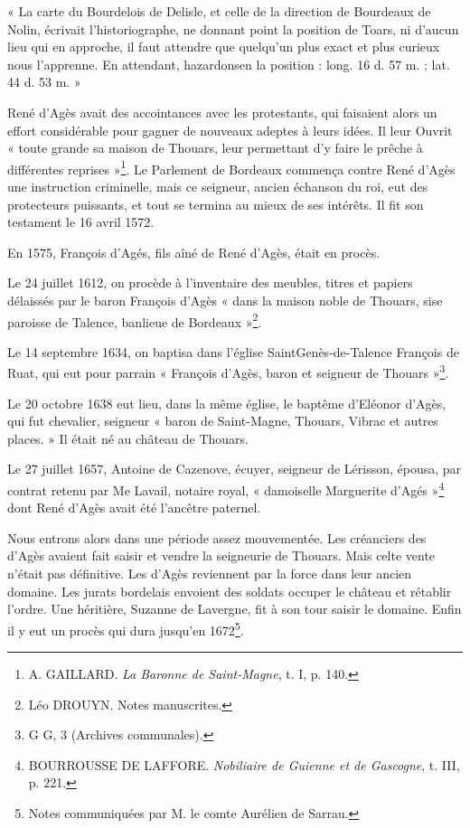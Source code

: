 « La carte du Bourdelois de Delisle, et celle de la direction de Bourdeaux de Nolin, écrivait l'historiographe, ne donnant point la position de Toars, ni d'aucun lieu qui en approche, il faut attendre que quelqu'un plus exact et plus curieux nous l'apprenne. En attendant, hazardonsen la position : long. 16 d. 57 m. ; lat. 44 d. 53 m. »

René d'Agès avait des accointances avec les protestants, qui faisaient alors un effort considérable pour gagner de nouveaux adeptes à leurs idées. Il leur Ouvrit « toute grande sa maison de Thouars, leur permettant d'y faire le prêche à différentes reprises »\footnote{A. GAILLARD. \textit{La Baronne de Saint-Magne}, t. I, p. 140.}. Le Parlement de Bordeaux commença contre René d'Agès une instruction criminelle, mais ce seigneur, ancien échanson du roi, eut des protecteurs puissants, et tout se termina au mieux de ses intérêts. Il fit son testament le 16 avril 1572.

En 1575, François d'Agés, fils aîné de René d'Agès, était en procès. 

Le 24 juillet 1612, on procède à l'inventaire des meubles, titres et papiers délaissés par le baron François d'Agès « dans la maison noble de Thouars, sise paroisse de Talence, banlieue de Bordeaux »\footnote{Léo DROUYN. Notes manuscrites.}.

Le 14 septembre 1634, on baptisa dans l'église SaintGenès-de-Talence François de Ruat, qui eut pour parrain « François d'Agès, baron et seigneur de Thouars »\footnote{G G, 3 (Archives communales).}.

Le 20 octobre 1638 eut lieu, dans la même église, le baptême d'Eléonor d'Agès, qui fut chevalier, seigneur « baron de Saint-Magne, Thouars, Vibrac et autres places. » Il était né au château de Thouars.

Le 27 juillet 1657, Antoine de Cazenove, écuyer, seigneur de Lérisson, épousa, par contrat retenu par Me Lavail, notaire royal, « damoiselle Marguerite d'Agés »\footnote{BOURROUSSE DE LAFFORE. \textit{Nobiliaire de Guienne et de Gascogne}, t. III, p. 221.} dont René d'Agès avait été l'ancêtre paternel.

Nous entrons alors dans une période assez mouvementée. Les créanciers des d'Agès avaient fait saisir et vendre la seigneurie de Thouars. Mais celte vente n'était pas définitive. Les d'Agès reviennent par la force dans leur ancien domaine. Les jurats bordelais envoient des soldats occuper le château et rétablir l'ordre. Une héritière, Suzanne de Lavergne, fit à son tour saisir le domaine. Enfin il y eut un procès qui dura jusqu'en 1672\footnote{Notes communiquées par M. le comte Aurélien de Sarrau.}.


